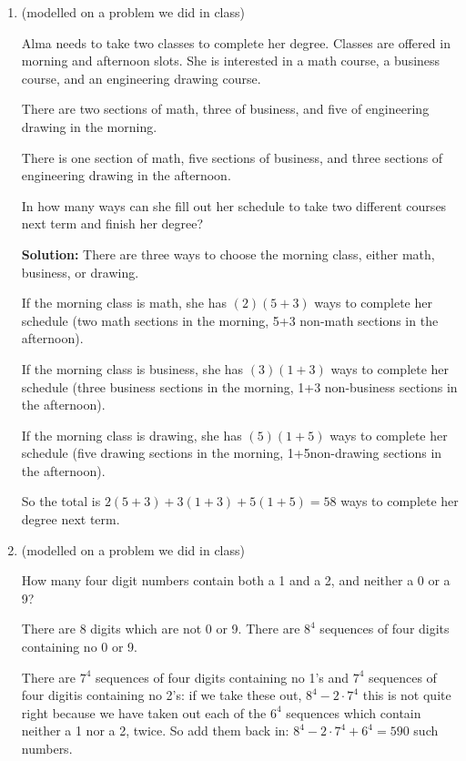 \documentclass[12pt]{article}
\begin{document}
\begin{enumerate}

\item (modelled on a problem we did in class)

Alma needs to take two classes to complete her degree.  Classes are offered in morning and afternoon slots.  She is interested in a math course, a business course, and an engineering drawing course.

There are two sections of math, three of business, and five of engineering drawing in the morning.

There is one section of math, five sections of business, and three sections of engineering drawing in the afternoon.

In how many ways can she fill out her schedule to take two different courses next term and finish her degree?

{\bf Solution:}  There are three ways to choose the morning class, either math, business, or drawing.

If the morning class is math, she has $(2)(5+3)$ ways to complete her schedule (two math sections in the morning,
5+3 non-math sections in the afternoon).

If the morning class is business, she has $(3)(1+3)$ ways to complete her schedule (three business sections in the morning,
1+3 non-business sections in the afternoon).

If the morning class is drawing, she has $(5)(1+5)$ ways to complete her schedule (five drawing sections in the morning,
1+5non-drawing sections in the afternoon).

So the total is $2(5+3) + 3(1+3) + 5(1+5)= 58$ ways to complete her degree next term.

\newpage

\item (modelled on a problem we did in class)

How many four digit numbers contain both a 1 and a 2, and neither a 0 or a 9?

There are 8 digits which are not 0 or 9.  There are $8^4$ sequences of four digits containing no 0 or 9.

There are $7^4$ sequences of four digits containing no 1's and $7^4$ sequences of four digitis containing no 2's:
if we take these out, $8^4-2\cdot 7^4$ this is not quite right because we have taken out each of the $6^4$ sequences which contain neither a 1 nor a 2, twice.  So add them back in: $8^4-2\cdot 7^4+6^4=590$ such numbers.


\end{enumerate}
\end{document}
